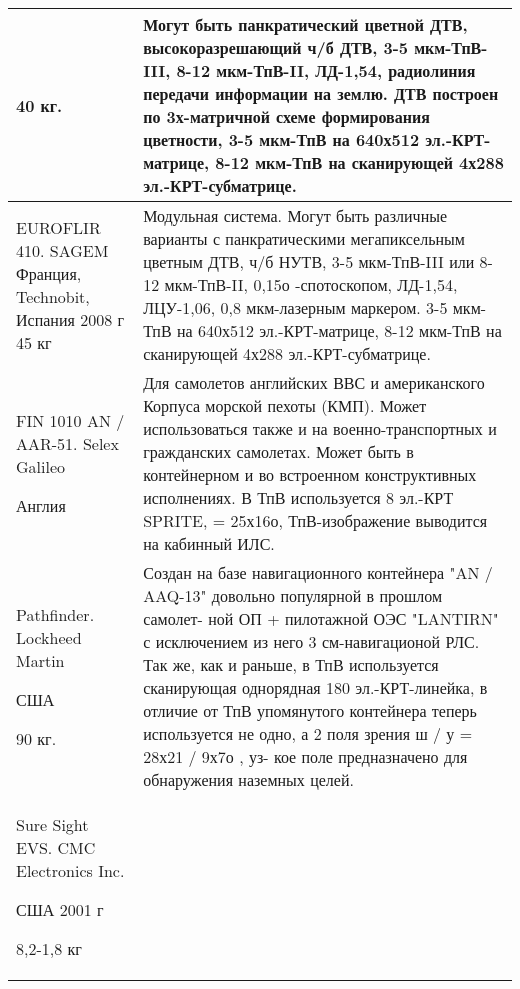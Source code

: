 \begin{landscape}
\begin{longtable}{| p{6cm} | p{18cm} |}
		40 кг. 
		       
& 
Могут быть панкратический цветной ДТВ, высокоразрешающий ч/б ДТВ, 3-5 мкм-ТпВ-III, 8-12 мкм-ТпВ-II, ЛД-1,54, радиолиния передачи информации на землю. 
ДТВ построен по 3х-матричной схеме формирования цветности, 3-5 мкм-ТпВ на 640х512 эл.-КРТ-матрице, 8-12 мкм-ТпВ на сканирующей 4х288 эл.-КРТ-субматрице. 
   
\\ \hline
		EUROFLIR 410. SAGEM
		\cite[]{EUROFLIR}
		Франция, Technobit, Испания	2008 г	45 кг
		       
& 
Модульная система. Могут быть различные варианты с панкратическими мегапиксельным цветным 
ДТВ, ч/б НУТВ, 3-5 мкм-ТпВ-III или 8-12 мкм-ТпВ-II, 0,15о
-спотоскопом, ЛД-1,54, ЛЦУ-1,06, 0,8 мкм-лазерным маркером. 3-5 мкм-ТпВ на 640х512 эл.-КРТ-матрице, 8-12 мкм-ТпВ на сканирующей 4х288 эл.-КРТ-субматрице.
   
\\ \hline
		FIN 1010 AN / AAR-51. Selex Galileo	
		
		Англия		     
& 
Для самолетов английских ВВС и американского Корпуса морской пехоты (КМП). Может использоваться также и на военно-транспортных и гражданских самолетах. Может быть в контейнерном и во встроенном конструктивных исполнениях. 
В ТпВ используется 8 эл.-КРТ SPRITE, = 25х16о, ТпВ-изображение выводится на кабинный ИЛС. 
   
\\ \hline
		Pathfinder. Lockheed Martin	
		
		США		
		
		90 кг.       
& 
Создан на базе навигационного контейнера "AN / AAQ-13" довольно популярной в прошлом самолет-
ной ОП + пилотажной ОЭС "LANTIRN" с исключением из него 3 см-навигационой РЛС. 
Так же, как и раньше, в ТпВ используется сканирующая однорядная 180 эл.-КРТ-линейка, в отличие 
от ТпВ упомянутого контейнера теперь используется не одно, а 2 поля зрения ш / у = 28х21 / 9х7о
, уз-
кое поле предназначено для обнаружения наземных целей.     
\\ \hline
		Sure Sight EVS. CMC Electronics Inc.	
		
		США	2001 г	
		
		8,2-1,8 кг
		        

\end{longtable}
\end{landscape}
